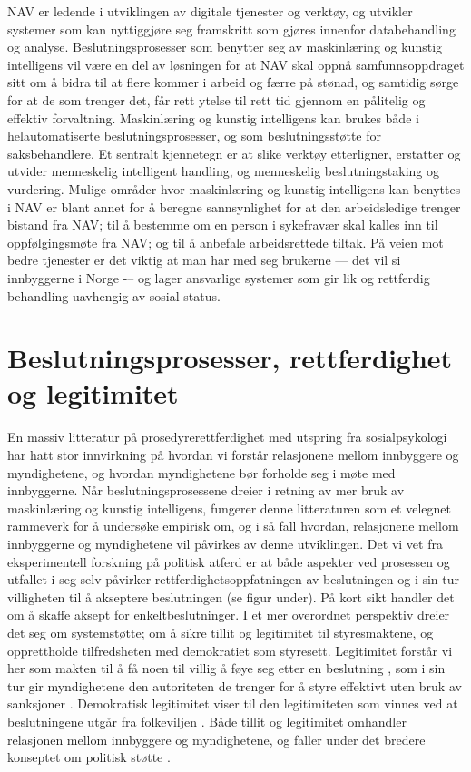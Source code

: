 \documentclass[
]{book}
\begin{document}
NAV er ledende i utviklingen av digitale tjenester og verktøy\citep{hansen2018digitalization}, og utvikler systemer som kan nyttiggjøre seg framskritt som gjøres innenfor databehandling og analyse.
Beslutningsprosesser som benytter seg av maskinlæring og kunstig intelligens vil være en del av løsningen for at NAV skal oppnå samfunnsoppdraget sitt om å bidra til at flere kommer i arbeid og færre på stønad, og samtidig sørge for at de som trenger det, får rett ytelse til rett tid gjennom en pålitelig og effektiv forvaltning.
Maskinlæring og kunstig intelligens kan brukes både i helautomatiserte beslutningsprosesser, og som beslutningsstøtte for saksbehandlere.
Et sentralt kjennetegn er at slike verktøy etterligner, erstatter og utvider menneskelig intelligent handling, og menneskelig beslutningstaking og vurdering.
Mulige områder hvor maskinlæring og kunstig intelligens kan benyttes i NAV er blant annet for å beregne sannsynlighet for at den arbeidsledige trenger bistand fra NAV; til å bestemme om en person i sykefravær skal kalles inn til oppfølgingsmøte fra NAV; og til å anbefale arbeidsrettede tiltak.
På veien mot bedre tjenester er det viktig at man har med seg brukerne --- det vil si innbyggerne i Norge -\/-- og lager ansvarlige systemer som gir lik og rettferdig behandling uavhengig av sosial status.

\hypertarget{beslutningsprosesser-rettferdighet-og-legitimitet}{%
\section{Beslutningsprosesser, rettferdighet og legitimitet}\label{beslutningsprosesser-rettferdighet-og-legitimitet}}

En massiv litteratur på prosedyrerettferdighet med utspring fra sosialpsykologi \citep{lind1988social} har hatt stor innvirkning på hvordan vi forstår relasjonene mellom innbyggere og myndighetene, og hvordan myndighetene bør forholde seg i møte med innbyggerne.
Når beslutningsprosessene dreier i retning av mer bruk av maskinlæring og kunstig intelligens, fungerer denne litteraturen som et velegnet rammeverk for å undersøke empirisk om, og i så fall hvordan, relasjonene mellom innbyggerne og myndighetene vil påvirkes av denne utviklingen.
Det vi vet fra eksperimentell forskning på politisk atferd er at både aspekter ved prosessen og utfallet i seg selv påvirker rettferdighetsoppfatningen av beslutningen og i sin tur villigheten til å akseptere beslutningen (se figur under).
På kort sikt handler det om å skaffe aksept for enkeltbeslutninger.
I et mer overordnet perspektiv dreier det seg om systemstøtte; om å sikre tillit og legitimitet til styresmaktene, og opprettholde tilfredsheten med demokratiet som styresett.
Legitimitet forstår vi her som makten til å få noen til villig å føye seg etter en beslutning \citep{weber2009theory}, som i sin tur gir myndighetene den autoriteten de trenger for å styre effektivt uten bruk av sanksjoner \citep{tyler2021people}.
Demokratisk legitimitet viser til den legitimiteten som vinnes ved at beslutningene utgår fra folkeviljen \citep{rosanvallon2011democratic}.
Både tillit og legitimitet omhandler relasjonen mellom innbyggere og myndighetene, og faller under det bredere konseptet om politisk støtte \citep{easton1965systems}.
\end{document}
